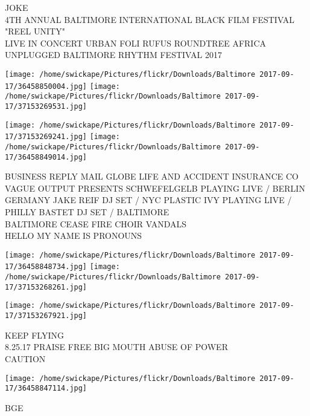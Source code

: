 \documentclass[10pt,letterpaper]{article}
\begin{document}
JOKE\\
4TH ANNUAL BALTIMORE INTERNATIONAL BLACK FILM FESTIVAL "REEL UNITY"\\
LIVE IN CONCERT URBAN FOLI RUFUS ROUNDTREE AFRICA UNPLUGGED BALTIMORE RHYTHM FESTIVAL 2017
\pagebreak

\texttt{[image: /home/swickape/Pictures/flickr/Downloads/Baltimore 2017-09-17/36458850004.jpg]}
\texttt{[image: /home/swickape/Pictures/flickr/Downloads/Baltimore 2017-09-17/37153269531.jpg]}

\texttt{[image: /home/swickape/Pictures/flickr/Downloads/Baltimore 2017-09-17/37153269241.jpg]}
\texttt{[image: /home/swickape/Pictures/flickr/Downloads/Baltimore 2017-09-17/36458849014.jpg]}

BUSINESS REPLY MAIL GLOBE LIFE AND ACCIDENT INSURANCE CO\\
VAGUE OUTPUT PRESENTS SCHWEFELGELB  PLAYING LIVE / BERLIN GERMANY JAKE REIF DJ SET / NYC PLASTIC IVY PLAYING LIVE / PHILLY BASTET DJ SET / BALTIMORE\\
BALTIMORE CEASE FIRE CHOIR VANDALS\\
HELLO MY NAME IS PRONOUNS
\pagebreak

\texttt{[image: /home/swickape/Pictures/flickr/Downloads/Baltimore 2017-09-17/36458848734.jpg]}
\texttt{[image: /home/swickape/Pictures/flickr/Downloads/Baltimore 2017-09-17/37153268261.jpg]}

\texttt{[image: /home/swickape/Pictures/flickr/Downloads/Baltimore 2017-09-17/37153267921.jpg]}

KEEP FLYING\\
8.25.17 PRAISE FREE BIG MOUTH ABUSE OF POWER\\
CAUTION
\pagebreak

\texttt{[image: /home/swickape/Pictures/flickr/Downloads/Baltimore 2017-09-17/36458847114.jpg]}

BGE
\pagebreak
\end{document}
